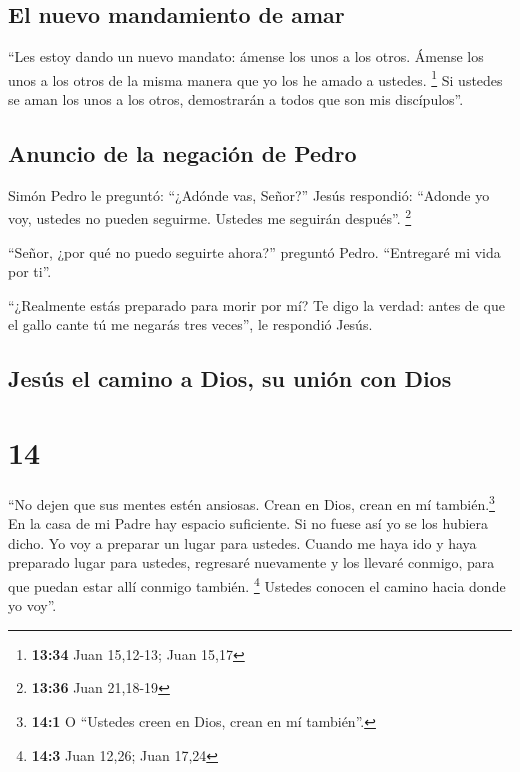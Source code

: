 \hypertarget{el-nuevo-mandamiento-de-amar}{%
\subsection{El nuevo mandamiento de
amar}\label{el-nuevo-mandamiento-de-amar}}

 ``Les estoy dando un nuevo mandato: ámense los unos a
los otros. Ámense los unos a los otros de la misma manera que yo los he
amado a ustedes. \footnote{\textbf{13:34} Juan 15,12-13; Juan 15,17}
 Si ustedes se aman los unos a los otros, demostrarán a
todos que son mis discípulos''.

\hypertarget{anuncio-de-la-negaciuxf3n-de-pedro}{%
\subsection{Anuncio de la negación de
Pedro}\label{anuncio-de-la-negaciuxf3n-de-pedro}}

 Simón Pedro le preguntó: ``¿Adónde vas, Señor?'' Jesús
respondió: ``Adonde yo voy, ustedes no pueden seguirme. Ustedes me
seguirán después''. \footnote{\textbf{13:36} Juan 21,18-19}

 ``Señor, ¿por qué no puedo seguirte ahora?'' preguntó
Pedro. ``Entregaré mi vida por ti''.

 ``¿Realmente estás preparado para morir por mí? Te digo
la verdad: antes de que el gallo cante tú me negarás tres veces'', le
respondió Jesús.

\hypertarget{jesuxfas-el-camino-a-dios-su-uniuxf3n-con-dios}{%
\subsection{Jesús el camino a Dios, su unión con
Dios}\label{jesuxfas-el-camino-a-dios-su-uniuxf3n-con-dios}}

\hypertarget{section-13}{%
\section{14}\label{section-13}}

 ``No dejen que sus mentes estén ansiosas. Crean en Dios,
crean en mí también.\footnote{\textbf{14:1} O ``Ustedes creen en Dios,
  crean en mí también''.}  En la casa de mi Padre hay
espacio suficiente. Si no fuese así yo se los hubiera dicho. Yo voy a
preparar un lugar para ustedes.  Cuando me haya ido y haya
preparado lugar para ustedes, regresaré nuevamente y los llevaré
conmigo, para que puedan estar allí conmigo también. \footnote{\textbf{14:3}
  Juan 12,26; Juan 17,24}  Ustedes conocen el camino hacia
donde yo voy''.

